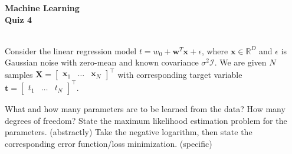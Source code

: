 \documentclass[11pt,noanswers,addpoints]{exam}
\newcommand{\R}{\mathbb R}
\newcommand{\X}{\mathbf X}
\newcommand{\x}{\mathbf x}
\newcommand{\w}{\mathbf w}
\renewcommand{\t}{\mathbf t}
\begin{document}
{\Large{\textbf{Machine Learning}}} \\[2mm]
\textbf{\Huge{Quiz 4}}

\hfill\hfill{}\\


Consider the linear regression model $t = w_0 + \w^T\x + \epsilon$, where $\x\in\R^D$ and $\epsilon$ is Gaussian noise with zero-mean and known covariance $\sigma^2\mathcal I$. We are given $N$ samples $\X=\begin{bmatrix}\x_1&\ldots&\x_N\end{bmatrix}^\top$ with corresponding target variable $\t=\begin{bmatrix}t_1 & \ldots & t_N\end{bmatrix}^\top$.
\begin{questions}
\question[1] What and how many parameters are to be learned from the data? How many degrees of freedom?\vspace{1in}
\question[1] State the maximum likelihood estimation problem for the parameters. (abstractly) \vspace{1.5in}
\question[2] Take the negative logarithm, then state the corresponding error function/loss minimization. (specific)
\end{questions}
\end{document}
